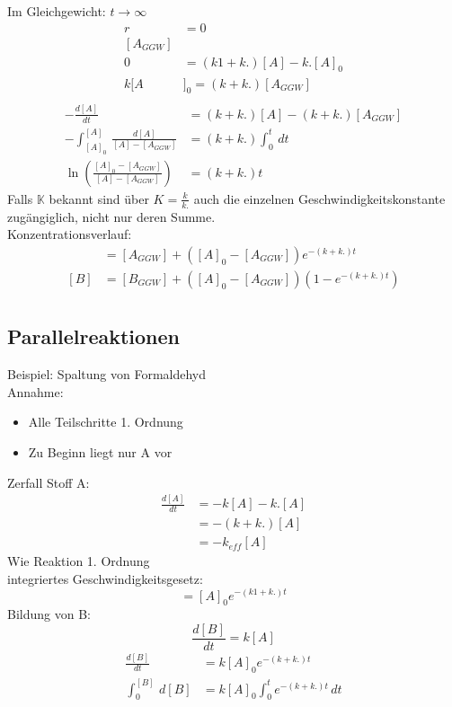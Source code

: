 \documentclass[a4paper, fleqn]{article}
\begin{document}
Im Gleichgewicht: $t \rightarrow \infty$\\
\begin{align*}
    r &= 0\\
    [A_{GGW}]\\
    0 &= (k1+k.)[A]-k.[A]_0\\
    k[A&]_0=(k+k.)[A_{GGW}]\\
\end{align*}
\begin{align*}
    -\frac{d[A]}{dt} &= (k+k.)[A]-(k+k.)[A_{GGW}]\\
    - \int_{[A]_0}^{[A]}\,\frac{d[A]}{[A]-[A_{GGW}]} &= (k+k.) \int_{0}^{t}\,dt\\
    \ln \left(\frac{[A]_0 - [A_{GGW}]}{[A]-[A_{GGW}]}\right) &= (k+k.)t
\end{align*}
Falls $\mathbb{K}$ bekannt sind über $K = \frac{k}{k.}$ auch die einzelnen Geschwindigkeitskonstante zugängiglich, nicht nur deren Summe.\\
Konzentrationsverlauf:
\begin{align*}
    [A] &= [A_{GGW}] + \left([A]_0-[A_{GGW}]\right)e^{-(k+k.)t}\\
    [B] &= [B_{GGW}] + \left([A]_0-[A_{GGW}]\right)\left(1-e^{-(k+k.)t}\right)\\
\end{align*}

\subsection{Parallelreaktionen}
Beispiel: Spaltung von Formaldehyd\\
Annahme:
\begin{itemize}
    \item Alle Teilschritte 1. Ordnung
    \item Zu Beginn liegt nur A vor
\end{itemize}
Zerfall Stoff A:
\begin{align*}
    \frac{d[A]}{dt} &= -k[A]-k.[A]\\
    &= -(k+k.)[A]\\
    &= -k_{eff} [A]
\end{align*}
Wie Reaktion 1. Ordnung\\
integriertes Geschwindigkeitsgesetz:
\begin{equation*}
    [A] = [A]_0 e^{-(k1+k.)t}
\end{equation*}
Bildung von B:
\begin{equation*}
    \frac{d[B]}{dt} = k[A]
\end{equation*}
\begin{align*}
    \frac{d[B]}{dt} &= k[A]_0 e^{-(k+k.)t}\\
    \int_{0}^{[B]}\,d[B] &= k[A]_0 \int_{0}^{t} e^{-(k+k.)t}\,dt\\
\end{align*}
\end{document}
